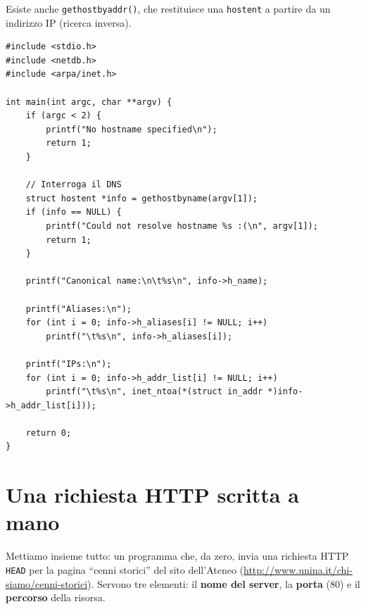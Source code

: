 Esiste anche \texttt{gethostbyaddr()}, che restituisce una \texttt{hostent} a partire da un indirizzo IP (ricerca inversa).

\begin{lstlisting}[language={[POSIX]C}, style=wnumbers, title={dns\_lookup.c}]
#include <stdio.h>
#include <netdb.h>
#include <arpa/inet.h>

int main(int argc, char **argv) {
    if (argc < 2) {
        printf("No hostname specified\n");
        return 1;
    }

    // Interroga il DNS
    struct hostent *info = gethostbyname(argv[1]);
    if (info == NULL) {
        printf("Could not resolve hostname %s :(\n", argv[1]);
        return 1;
    }

    printf("Canonical name:\n\t%s\n", info->h_name);

    printf("Aliases:\n");
    for (int i = 0; info->h_aliases[i] != NULL; i++)
        printf("\t%s\n", info->h_aliases[i]);

    printf("IPs:\n");
    for (int i = 0; info->h_addr_list[i] != NULL; i++)
        printf("\t%s\n", inet_ntoa(*(struct in_addr *)info->h_addr_list[i]));

    return 0;
}
\end{lstlisting}


\section{Una richiesta HTTP scritta a mano}

Mettiamo insieme tutto: un programma che, da zero, invia una richiesta HTTP \texttt{HEAD} per la pagina
``cenni storici'' del sito dell'Ateneo (\url{http://www.unina.it/chi-siamo/cenni-storici}). Servono tre
elementi: il \textbf{nome del server}, la \textbf{porta} (80) e il \textbf{percorso} della risorsa.

